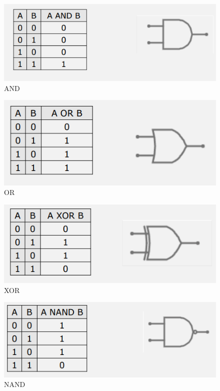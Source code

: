 \documentclass{article}
\begin{document}
\begin{figure}[h]
  \centering
  \includegraphics[scale=0.7]{IM_AND}
  \caption{AND}
  \label{AND}
\end{figure}

\begin{figure}[h]
  \centering
  \includegraphics[scale=0.7]{IM_OR}
  \caption{OR}
  \label{OR}
\end{figure}

\begin{figure}[h]
  \centering
  \includegraphics[scale=0.7]{IM_XOR}
  \caption{XOR}
  \label{XOR}
\end{figure}


\begin{figure}[h]
  \centering
  \includegraphics[scale=0.7]{IM_NAND}
  \caption{NAND}
  \label{NAND}
\end{figure}
\end{document}
